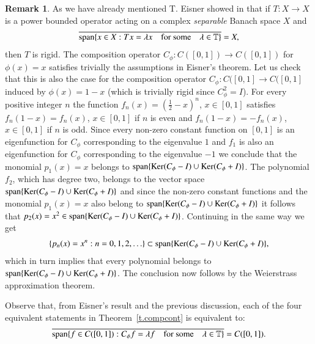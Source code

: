 \documentclass[12pt,leqno]{amsart}
\theoremstyle{plain}
\theoremstyle{definition}
\newtheorem{remark}[equation]{Remark}
\numberwithin{equation}{section}
\begin{document}
\begin{remark}
	As we have already mentioned T. Eisner showed in \cite{EIS} that if $T:X\to X$ is a power bounded operator acting on a complex \emph{separable} Banach space $X$ and 
	\begin{align*}
		\overline{\textnormal{span} \{x\in X: Tx=\lambda x\quad \text{for some} \quad \lambda \in {\mathbb T} \}}=X, 
	\end{align*}
	then $T$ is rigid. The composition operator $C_\phi :C([0,1])\to C([0,1])$ for $\phi (x)=x$ satisfies trivially the assumptions in Eisner's theorem. Let us check that this is also the case for the composition operator $C_\phi :C([0,1]\to C([0,1]$ induced by $\phi (x)=1-x$ (which is trivially rigid since $C_\phi ^2=I$). For every positive integer $n$ the function $f_n(x)=(\frac{1}{2}-x)^n$, $x\in [0,1]$ satisfies $f_n(1-x)=f_n(x)$, $x\in [0,1]$ if $n$ is even and $f_n(1-x)=-f_n(x)$, $x\in [0,1]$ if $n$ is odd. Since every non-zero constant function on $[0,1]$ is an eigenfunction for $C_\phi$ corresponding to the eigenvalue $1$ and $f_1$ is also an eigenfunction for $C_\phi$ corresponding to the eigenvalue $-1$ we conclude that the monomial $p_1(x)=x$ belongs to $\textnormal{span} \{{\textnormal{Ker}}(C_\phi -I)\cup {\textnormal{Ker}}(C_\phi+I)\}$. The polynomial $f_2$, which has degree two, belongs to the vector space $\textnormal{span}\{{\textnormal{Ker}}(C_\phi -I)\cup {\textnormal{Ker}}(C_\phi+I)\}$ and since the non-zero constant functions and the monomial $p_1(x)=x$ also belong to $\textnormal{span}\{{\textnormal{Ker}}(C_\phi -I)\cup {\textnormal{Ker}}(C_\phi+I)\}$ it follows that $p_2(x)=x^2 \in \textnormal{span} \{{\textnormal{Ker}}(C_\phi -I)\cup {\textnormal{Ker}}(C_\phi+I)\}$. Continuing in the same way we get 
	\begin{align*}
		\{ p_n(x)=x^n: n=0,1,2,\ldots \} \subset \textnormal{span}\{{\textnormal{Ker}}(C_\phi -I)\cup {\textnormal{Ker}}(C_\phi+I)\} , 
	\end{align*}
	which in turn implies that every polynomial belongs to $\textnormal{span} \{ {\textnormal{Ker}}(C_\phi -I)\cup {\textnormal{Ker}}(C_\phi+I)\}$. The conclusion now follows by the Weierstrass approximation theorem.
	
	Observe that, from Eisner's result and the previous discussion, each of the four equivalent statements in Theorem~\ref{t.compcont} is equivalent to: 
	\begin{align*}
		\overline{ \textnormal{span}\{ f\in C([0,1]): C_\phi f=\lambda f \quad \text{for some} \quad \lambda \in {\mathbb T} \}}=C([0,1]). 
	\end{align*}
\end{remark}
\end{document}
